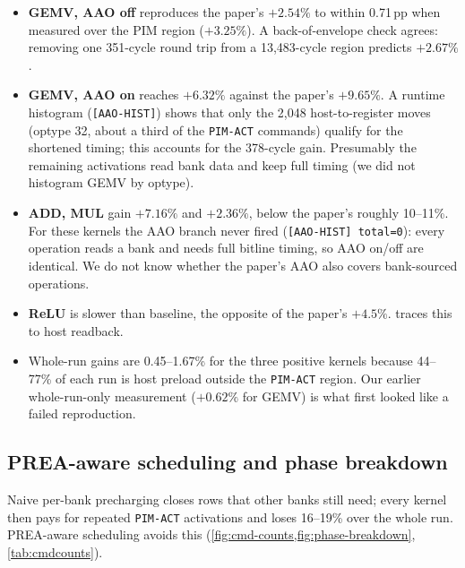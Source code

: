 \documentclass[conference]{IEEEtran}
\newcommand{\cmd}[1]{\texttt{\footnotesize #1}}
\newcommand{\pimact}{\cmd{PIM-ACT}\xspace}
\begin{document}
\begin{itemize}
\item \textbf{GEMV, AAO off} reproduces the paper's $+2.54\%$ to within 0.71\,pp when measured over the PIM region ($+3.25\%$). A back-of-envelope check agrees: removing one 351-cycle round trip from a 13{,}483-cycle region predicts $+2.67\%$.
\item \textbf{GEMV, AAO on} reaches $+6.32\%$ against the paper's $+9.65\%$. A runtime histogram (\cmd{[AAO-HIST]}) shows that only the 2{,}048 host-to-register moves (optype 32, about a third of the \pimact commands) qualify for the shortened timing; this accounts for the 378-cycle gain. Presumably the remaining activations read bank data and keep full timing (we did not histogram GEMV by optype).
\item \textbf{ADD, MUL} gain $+7.16\%$ and $+2.36\%$, below the paper's roughly 10--11\%. For these kernels the AAO branch never fired (\cmd{[AAO-HIST] total=0}): every operation reads a bank and needs full bitline timing, so AAO on/off are identical. We do not know whether the paper's AAO also covers bank-sourced operations.
\item \textbf{ReLU} is slower than baseline, the opposite of the paper's $+4.5\%$.  traces this to host readback.
\item Whole-run gains are 0.45--1.67\% for the three positive kernels because 44--77\% of each run is host preload outside the \pimact region. Our earlier whole-run-only measurement ($+0.62\%$ for GEMV) is what first looked like a failed reproduction.
\end{itemize}

\subsection{PREA-aware scheduling and phase breakdown}
Naive per-bank precharging closes rows that other banks still need; every kernel then pays for repeated \pimact activations and loses 16--19\% over the whole run. PREA-aware scheduling avoids this (\cref{fig:cmd-counts,fig:phase-breakdown}, \cref{tab:cmdcounts}).
\end{document}
